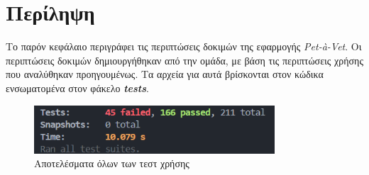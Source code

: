 \documentclass[12pt,a4paper,twoside]{book}
\begin{document}
\section{Περίληψη}

Το παρόν κεφάλαιο περιγράφει τις περιπτώσεις δοκιμών της εφαρμογής \textit{Pet-à-Vet}. Οι περιπτώσεις δοκιμών δημιουργήθηκαν από την ομάδα, με βάση τις περιπτώσεις χρήσης που αναλύθηκαν προηγουμένως. Τα αρχεία για αυτά βρίσκονται στον κώδικα ενσωματομένα στον φάκελο \textit{\textbf{tests}}. %

\begin{figure}
    \centering
    \includegraphics[width=0.8\textwidth]{Resources/tests.png}
    \caption{Αποτελέσματα όλων των τεστ χρήσης}\label{fig:test-cases}
\end{figure}
\end{document}
